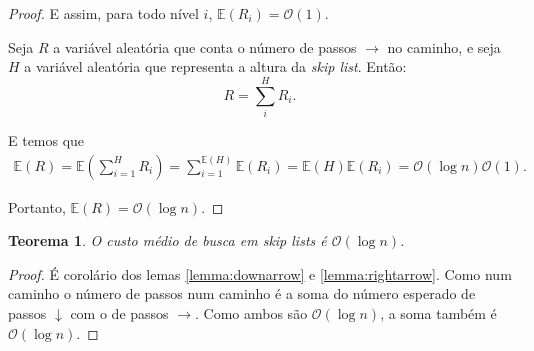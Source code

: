\documentclass[paper=a4, fontsize=11pt]{scrartcl} %
\newtheorem{theorem}{Teorema}
\numberwithin{equation}{section}
\numberwithin{figure}{section}
\numberwithin{table}{section}
\numberwithin{definition}{section}
\numberwithin{theorem}{section}
\numberwithin{property}{section}
\numberwithin{proposition}{section}
\newcommand{\cO}{\ensuremath{\mathcal{O}}}
\newcommand{\sls}{\textit{skip lists}\xspace}
\newcommand{\skl}{\textit{skip list}\xspace}
\newcommand{\Exp}{\ensuremath{{\mathbb{E}}}\xspace}
\begin{document}
\begin{proof}
E assim, para todo nível $i$, $\Exp(R_i) = \cO(1)$.

Seja $R$ a variável aleatória que conta o número de passos $\rightarrow$ no caminho, 
e seja $H$ a variável aleatória que representa a altura da \skl. Então:
$$
R = \sum_i^H R_i.
$$

E temos que
\begin{align*}
\Exp(R) = \Exp \left( \sum_{i=1}^H R_i \right) = \sum_{i=1}^{\Exp(H)} \Exp(R_i)
 =  \Exp(H) \Exp(R_i) = \cO(\log n) \cO(1).
\end{align*}

Portanto, $\Exp(R) = \cO(\log n).$

\end{proof}



\begin{theorem}
O custo médio de busca em \sls é $\cO(\log n)$. 
\end{theorem}

\begin{proof}
É corolário dos lemas \ref{lemma:downarrow} e \ref{lemma:rightarrow}. Como num caminho o número de passos
num caminho é a soma do número esperado de passos $\downarrow$ com o de passos $\rightarrow$. Como ambos são
$\cO(\log n)$, a soma também é $\cO(\log n)$.
\end{proof}





{}
\end{document}

